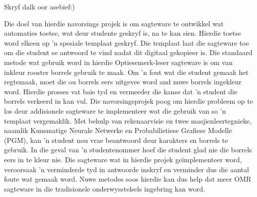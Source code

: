
\begin{uittreksel}    %
Skryf dalk oor asebief:)

Die doel van hierdie navorsings projek is om sagteware te ontwikkel wat automaties toetse, wat deur studente geskryf is, na te kan sien. Hierdie toetse word elkeen op 'n spesiale templaat geskryf. Die templaat laat die sagteware toe om die student se antwoord te vind nadat dit digitaal gekopieer is. Die standaard metode wat gebruik word in hierdie Optiesemerk-leser sagteware is om van inkleur rooster borrels gebruik te maak. Om 'n fout wat die student gemaak het regtemaak, moet die ou borrels eers uitgevee word and nuwe borrels ingekleur word. Hierdie prosses vat baie tyd en vermeeder die kanse dat 'n student die borrels verkeerd in kan vul. 
Die navorsingsprojek poog om hierdie probleem op te los deur addisionele sagteware te implementeer wat die gebruik van so 'n templaat vergemaklik. Met behulp van rekenaarvisie en twee masjienleertegnieke, naamlik Kunsmatige Neurale Netwerke en Probabilistiese Grafiese Modelle (PGM), kan 'n student nou vrae beantwoord deur karakters en borrels te gebruik. In die geval van 'n studentenommer hoef die student glad nie die borrels eers in te kleur nie. Die sagteware wat in hierdie projek geïmplementeer word, veroorsaak 'n verminderde tyd in antwoorde inskryf en verminder dus die aantal foute wat gemaak word. Nuwe metodes soos hierdie kan dus help dat meer OMR sagteware in die tradisionele onderwysstelsels ingebring kan word.
\end{uittreksel}